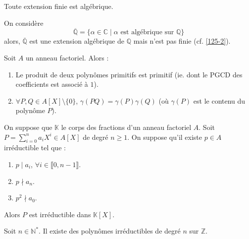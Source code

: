   \begin{proposition}
    Toute extension finie est algébrique.
  \end{proposition}

  \begin{cexample}
    \label{125-1}
    On considère
    \[ \overline{\mathbb{Q}} = \{ \alpha \in \mathbb{C} \mid \alpha \text{ est algébrique sur } \mathbb{Q} \} \]
    alors, $\overline{\mathbb{Q}}$ est une extension algébrique de $\mathbb{Q}$ mais n'est pas finie (cf. \cref{125-2}).
  \end{cexample}


  \begin{lemma}[Gauss]
    Soit $A$ un anneau factoriel. Alors :
    \begin{enumerate}[label=(\roman*)]
      \item Le produit de deux polynômes primitifs est primitif (ie. dont le PGCD des coefficients est associé à $1$).
      \item $\forall P, Q \in A[X] \setminus \{ 0 \}$, $\gamma(PQ) = \gamma(P) \gamma(Q)$ (où $\gamma(P)$ est le contenu du polynôme $P$).
    \end{enumerate}
  \end{lemma}


  \begin{theorem}
    On suppose que $\mathbb{K}$ le corps des fractions d'un anneau factoriel $A$. Soit $P = \sum_{i=0}^n a_i X^i \in A[X]$ de degré $n \geq 1$. On suppose qu'il existe $p \in A$ irréductible tel que :
    \begin{enumerate}[label=(\roman*)]
      \item $p \mid a_i$, $\forall i \in \llbracket 0, n-1 \rrbracket$.
      \item $p \nmid a_n$.
      \item $p^2 \nmid a_0$.
    \end{enumerate}
    Alors $P$ est irréductible dans $\mathbb{K}[X]$.
  \end{theorem}


  \begin{application}
    \label{125-2}
    Soit $n \in \mathbb{N}^*$. Il existe des polynômes irréductibles de degré $n$ sur $\mathbb{Z}$.
  \end{application}

